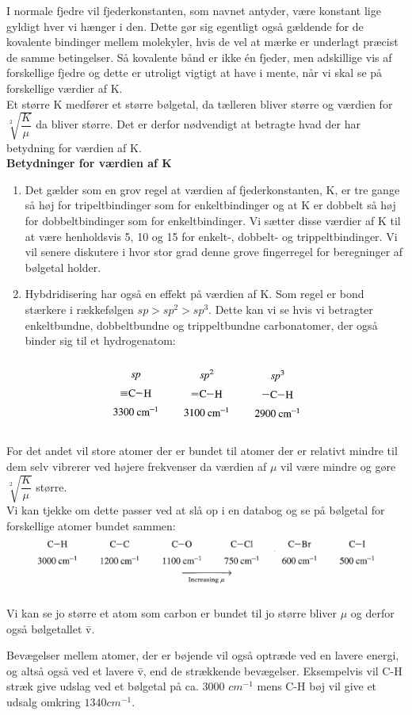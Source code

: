I normale fjedre vil fjederkonstanten, som navnet antyder, være konstant lige gyldigt hver vi hænger i den. Dette gør sig egentligt også gældende for de kovalente bindinger mellem molekyler, hvis de vel at mærke er underlagt præcist de samme betingelser. Så kovalente bånd er ikke én fjeder, men adskillige vis af forskellige fjedre og dette er utroligt vigtigt at have i mente, når vi skal se på forskellige værdier af K.
\\
Et større K medfører et større bølgetal, da tælleren bliver større og værdien for $\sqrt[2]{\dfrac{K}{\mu}}$ da bliver større. Det er derfor nødvendigt at betragte hvad der har betydning for værdien af K. 
\\
\textbf{Betydninger for værdien af K}
\begin{enumerate}
\item Det gælder som en grov regel at værdien af fjederkonstanten, K, er tre gange så høj for tripeltbindinger som for enkeltbindinger og at K er dobbelt så høj for dobbeltbindinger som for enkeltbindinger. Vi sætter disse værdier af K til at være henholdsvis 5, 10 og 15 for enkelt-, dobbelt- og trippeltbindinger. Vi vil senere diskutere i hvor stor grad denne grove fingerregel for beregninger af bølgetal holder.

\item Hybdridisering har også en effekt på værdien af K. Som regel er bond stærkere i rækkefølgen $sp > sp^2 > sp^3$. Dette kan vi se hvis vi betragter enkeltbundne, dobbeltbundne og trippeltbundne carbonatomer, der også binder sig til et hydrogenatom:

\begin{center}
\includegraphics[scale=1]{Billeder/sp}
\end{center}


\end{enumerate}

For det andet vil store atomer der er bundet til atomer der er relativt mindre til dem selv vibrerer ved højere frekvenser da værdien af $\mu$ vil være mindre og gøre $\sqrt[2]{\dfrac{K}{\mu}}$ større. 
\\
Vi kan tjekke om dette passer ved at slå op i en databog og se på bølgetal for forskellige atomer bundet sammen:
\\
\includegraphics[scale=1]{Billeder/udklip}

Vi kan se jo større et atom som carbon er bundet til jo større bliver $\mu$ og derfor også bølgetallet \={v}.

Bevægelser mellem atomer, der er bøjende vil også optræde ved en lavere energi, og altså også ved et lavere \={v}, end de strækkende bevægelser. Eksempelvis vil C-H stræk give udslag ved et bølgetal på ca. 3000 $cm^{-1}$ mens C-H bøj vil give et udsalg omkring $1340cm^{-1}$.
